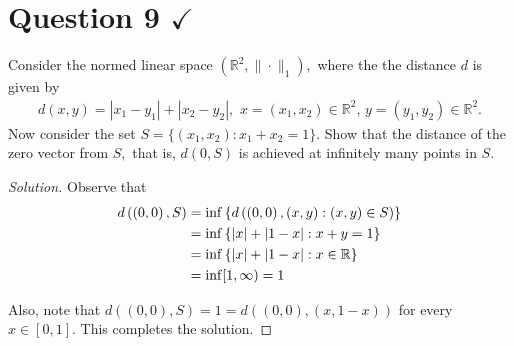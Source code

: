 \section{Question 9 \texorpdfstring{$\checkmark$}{}}
\horz

Consider the normed linear space $(\mathbb R ^{2}, \|\cdot\|_1 ),$ where the the distance $d$ is given by 
\begin{align*}
d(x,y) = |x_1-y_1| + |x_2-y_2|,\,\,x=(x_1,x_2)\in \mathbb R^2, \,y=(y_1,y_2)\in \mathbb R^2.
\end{align*}
 Now consider the set $S= \{ ( x_{1} , x_{2}) : x_{1} + x_{2} =1 \}$. Show that the distance of the zero vector from $S,$ that is, $d(0,S)$  is achieved at infinitely many points in $S$.
 
 \horz

 \begin{proof}[Solution]
    Observe that 
    \begin{align*}
	d\left( \left( 0,0 \right) , S \right)  &= \inf \left\{ d\left( \left( 0,0 \right) , \left( x,y \right) : \left( x,y \right) \in S \right) \right\} \\
	&=  \inf \left\{ \left\lvert x \right\rvert + \left\lvert 1-x \right\rvert : x+y =1 \right\} \\
	&= \inf\left\{ \left\lvert x \right\rvert + \left\lvert 1-x \right\rvert : x\in \mathbb R \right\} \\
	&= \inf [1, \infty) =1
    \end{align*}

    Also, note that $d\left( \left( 0,0 \right), S \right) = 1 = d\left( \left( 0,0 \right) , \left( x,1-x \right) \right)$ for every $x\in [0,1]$. This completes the solution.
\end{proof}
